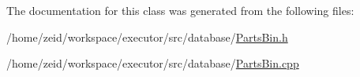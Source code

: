 The documentation for this class was generated from the following files:\begin{DoxyCompactItemize}
\item 
/home/zeid/workspace/executor/src/database/\hyperlink{_parts_bin_8h}{PartsBin.h}\item 
/home/zeid/workspace/executor/src/database/\hyperlink{_parts_bin_8cpp}{PartsBin.cpp}\end{DoxyCompactItemize}

